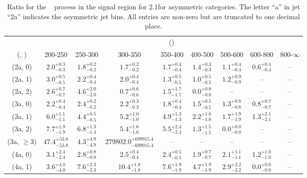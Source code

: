 \begin{table}[h!]
\tiny
\centering
\caption{Ratio for the \zInv~ process in the signal region for 2.1\ifb for asymmetric categories. The letter ``a'' in jet \eg ``2a''  indicates the asymmetric jet bins. All entries are non-zero but are truncated to one decimal place.\label{tab:ratiosep_sig_zinv_asym}}
\begin{tabular}
{ccccccccc}
	\hline\hline
	& \multicolumn{8}{c}{\scalht (\gev)} \\ 
	 (\njet,  \nb) & 200-250 & 250-300 & 300-350 & 350-400 & 400-500 & 500-600 & 600-800 & 800-$\infty$ \\ [0.8ex] 
\hline
	(2a, 0) & $2.0^{+ 0.3 }_{- 0.3 }$ & $1.8^{+ 0.2 }_{- 0.2 }$ & $1.7^{+ 0.2 }_{- 0.2 }$ & $1.7^{+ 0.4 }_{- 0.4 }$ & $1.4^{+ 0.3 }_{- 0.3 }$ & $1.1^{+ 0.4 }_{- 0.4 }$ & $0.6^{+ 0.4 }_{- 0.4 }$ & -- \\[0.5ex] 
	(2a, 1) & $3.0^{+ 0.5 }_{- 0.5 }$ & $2.2^{+ 0.4 }_{- 0.4 }$ & $2.0^{+ 0.4 }_{- 0.4 }$ & $1.3^{+ 0.5 }_{- 0.5 }$ & $1.0^{+ 0.5 }_{- 0.5 }$ & $1.2^{+ 0.9 }_{- 0.9 }$ & -- & -- \\[0.5ex] 
	(2a, 2) & $2.6^{+ 0.7 }_{- 0.7 }$ & $4.6^{+ 2.0 }_{- 2.0 }$ & $0.7^{+ 0.6 }_{- 0.6 }$ & $1.5^{+ 1.7 }_{- 1.7 }$ & $0.0^{+ 0.0 }_{- 0.0 }$ & -- & -- & -- \\[0.5ex] 
	(3a, 0) & $2.2^{+ 0.4 }_{- 0.4 }$ & $2.4^{+ 0.2 }_{- 0.2 }$ & $2.2^{+ 0.3 }_{- 0.3 }$ & $1.8^{+ 0.4 }_{- 0.4 }$ & $1.5^{+ 0.5 }_{- 0.5 }$ & $1.3^{+ 0.8 }_{- 0.8 }$ & $0.8^{+ 0.7 }_{- 0.7 }$ & -- \\[0.5ex] 
	(3a, 1) & $6.0^{+ 1.1 }_{- 1.1 }$ & $4.4^{+ 0.5 }_{- 0.5 }$ & $5.2^{+ 1.0 }_{- 1.0 }$ & $4.9^{+ 1.3 }_{- 1.3 }$ & $2.2^{+ 1.0 }_{- 1.0 }$ & $1.7^{+ 1.9 }_{- 1.9 }$ & $1.3^{+ 2.1 }_{- 2.1 }$ & -- \\[0.5ex] 
	(3a, 2) & $7.7^{+ 1.9 }_{- 1.9 }$ & $6.8^{+ 1.3 }_{- 1.3 }$ & $5.4^{+ 1.6 }_{- 1.6 }$ & $5.5^{+ 2.4 }_{- 2.4 }$ & $1.3^{+ 1.5 }_{- 1.5 }$ & $0.0^{+ 0.0 }_{- 0.0 }$ & -- & -- \\[0.5ex] 
	(3a, $\ge3$) & $47.4^{+ 53.8 }_{- 53.8 }$ & $4.3^{+ 4.9 }_{- 4.9 }$ & $279802.0^{+ 699915.4 }_{- 699915.4 }$ & -- & -- & -- & -- & -- \\[0.5ex] 
	(4a, 0) & $3.1^{+ 2.4 }_{- 2.4 }$ & $2.8^{+ 0.8 }_{- 0.8 }$ & $2.5^{+ 0.4 }_{- 0.4 }$ & $2.4^{+ 0.5 }_{- 0.5 }$ & $1.9^{+ 0.7 }_{- 0.7 }$ & $2.1^{+ 1.1 }_{- 1.1 }$ & $1.2^{+ 1.0 }_{- 1.0 }$ & -- \\[0.5ex] 
	(4a, 1) & $3.6^{+ 4.0 }_{- 4.0 }$ & $7.6^{+ 2.3 }_{- 2.3 }$ & $10.4^{+ 1.8 }_{- 1.8 }$ & $7.6^{+ 1.9 }_{- 1.9 }$ & $4.7^{+ 1.9 }_{- 1.9 }$ & $2.9^{+ 2.2 }_{- 2.2 }$ & $0.0^{+ 0.0 }_{- 0.0 }$ & -- \\[0.5ex] 

\end{tabular}
\end{table}
